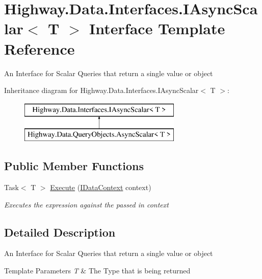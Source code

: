 \hypertarget{interface_highway_1_1_data_1_1_interfaces_1_1_i_async_scalar-g}{\section{Highway.\-Data.\-Interfaces.\-I\-Async\-Scalar$<$ T $>$ Interface Template Reference}
\label{interface_highway_1_1_data_1_1_interfaces_1_1_i_async_scalar-g}
}


An Interface for Scalar Queries that return a single value or object  


Inheritance diagram for Highway.\-Data.\-Interfaces.\-I\-Async\-Scalar$<$ T $>$\-:\begin{figure}[H]
\begin{center}
\leavevmode
\includegraphics[height=2.000000cm]{interface_highway_1_1_data_1_1_interfaces_1_1_i_async_scalar-g}
\end{center}
\end{figure}
\subsection*{Public Member Functions}
\begin{DoxyCompactItemize}
\item 
Task$<$ T $>$ \hyperlink{interface_highway_1_1_data_1_1_interfaces_1_1_i_async_scalar-g_a602c6cc9b11d9ae91c309df77fa91c09}{Execute} (\hyperlink{interface_highway_1_1_data_1_1_interfaces_1_1_i_data_context}{I\-Data\-Context} context)
\begin{DoxyCompactList}\small\item\em Executes the expression against the passed in context \end{DoxyCompactList}\end{DoxyCompactItemize}


\subsection{Detailed Description}
An Interface for Scalar Queries that return a single value or object 


\begin{DoxyTemplParams}{Template Parameters}
{\em T} & The Type that is being returned\\
\hline
\end{DoxyTemplParams}


